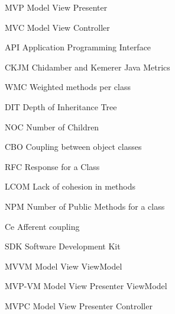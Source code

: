 \documentclass[
	12pt,				%
	a4paper,			%
	oneside,
	english,			%
	brazil,				%
	]{abntex2}
\begin{document}
\begin{siglas}
	\item[MVP] 	Model View Presenter
  	\item[MVC]	Model View Controller
  	\item[API] 	Application Programming Interface
  	\item[CKJM] Chidamber and Kemerer Java Metrics
   	\item[WMC] 	Weighted methods per class
 	\item[DIT] 	Depth of Inheritance Tree
 	\item[NOC] 	Number of Children
 	\item[CBO] 	Coupling between object classes
 	\item[RFC] 	Response for a Class
 	\item[LCOM] Lack of cohesion in methods
   	\item[NPM] 	Number of Public Methods for a class
\item[Ce]Afferent coupling
\item[SDK] Software Development Kit
\item[MVVM]  Model View ViewModel
\item[MVP-VM] Model View Presenter ViewModel
\item[MVPC] Model View Presenter Controller


\end{siglas}


\tableofcontents*
\cleardoublepage
\pagestyle{plain}
\textual













%

\postextual



\end{document}
